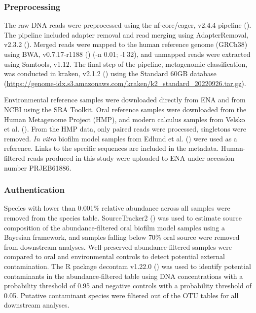 \documentclass[
  b5paper,
]{book}
\begin{document}
\subsubsection{Preprocessing}\label{preprocessing}

The raw DNA reads were preprocessed using the nf-core/eager, v2.4.4
pipeline ().
The pipeline included adapter removal and read merging using
AdapterRemoval, v2.3.2 (). Merged reads were mapped to the human reference genome (GRCh38)
using BWA, v0.7.17-r1188 () (-n
0.01; -l 32), and unmapped reads were extracted using Samtools, v1.12.
The final step of the pipeline, metagenomic classification, was
conducted in kraken, v2.1.2 ()
using the Standard 60GB database
(\url{https://genome-idx.s3.amazonaws.com/kraken/k2_standard_20220926.tar.gz}).

Environmental reference samples were downloaded directly from ENA and
from NCBI using the SRA Toolkit. Oral reference samples were downloaded
from the Human Metagenome Project (HMP), and modern calculus samples
from Velsko et al. (). From
the HMP data, only paired reads were processed, singletons were removed.
\emph{In vitro} biofilm model samples from Edlund et al.
() were used as a
reference. Links to the specific sequences are included in the metadata.
Human-filtered reads produced in this study were uploaded to ENA under
accession number PRJEB61886.

\subsubsection{Authentication}\label{authentication}

Species with lower than 0.001\% relative abundance across all samples
were removed from the species table. SourceTracker2
() was used
to estimate source composition of the abundance-filtered oral biofilm
model samples using a Bayesian framework, and samples falling below 70\%
oral source were removed from downstream analyses. Well-preserved
abundance-filtered samples were compared to oral and environmental
controls to detect potential external contamination. The R package
decontam v1.22.0 () was used
to identify potential contaminants in the abundance-filtered table using
DNA concentrations with a probability threshold of 0.95 and negative
controls with a probability threshold of 0.05. Putative contaminant
species were filtered out of the OTU tables for all downstream analyses.
\end{document}
